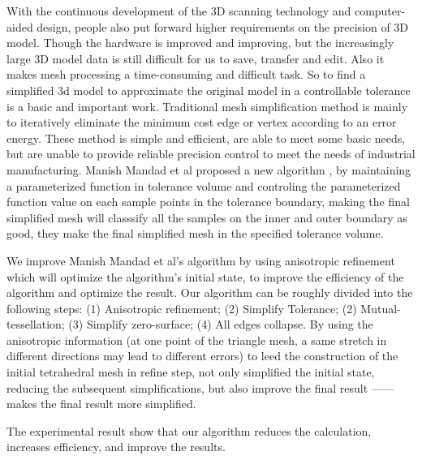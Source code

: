 

\begin{eabstract}
With the continuous development of the 3D scanning technology and computer-aided design, people also put forward higher requirements on the precision of 3D model.
Though the hardware is improved and improving, but the increasingly large 3D model data is still difficult for us to save, transfer and edit. Also it makes mesh processing a time-consuming and difficult task.
So to find a simplified 3d model to approximate the original model in a controllable tolerance is a basic and important work.
Traditional mesh simplification method is mainly to iteratively eliminate the minimum cost edge or vertex according to an error energy. These method is simple and efficient, are able to meet some basic needs, but are unable to provide reliable precision control to meet the needs of industrial manufacturing.
Manish Mandad et al proposed a new algorithm \cite{isotopic-appro}, by maintaining a parameterized function in tolerance volume and controling the parameterized function value on each sample points in the tolerance boundary, making the final simplified mesh will classsify all the samples on the inner and outer boundary as good, they make the final simplified mesh in the specified tolerance volume.\par

We improve Manish Mandad et al's algorithm by using anisotropic refinement which will optimize the algorithm's initial state, to improve the efficiency of the algorithm and optimize the result. Our algorithm can be roughly divided into the following steps: (1) Anisotropic refinement; (2) Simplify Tolerance; (2) Mutual-tessellation; (3) Simplify zero-surface; (4) All edges collapse. By using the anisotropic information (at one point of the triangle mesh, a same stretch in different directions may lead to different errors) to leed the construction of the initial tetrahedral mesh in refine step, not only simplified the initial state, reducing the subsequent simplifications, but also improve the final result —— makes the final result more simplified.\par
The experimental result show that our algorithm reduces the calculation, increases efficiency, and improve the results.
\end{eabstract}

